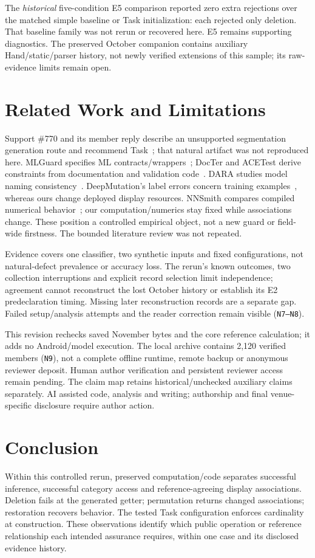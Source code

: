 \documentclass[10pt,conference]{IEEEtran}
\newcommand{\code}[1]{\texttt{#1}}
\begin{document}
The \emph{historical} five-condition E5 comparison reported zero extra rejections over the matched simple baseline or Task initialization: each rejected only deletion. That baseline family was not rerun or recovered here. E5 remains supporting diagnostics. The preserved October companion contains auxiliary Hand/static/parser history, not newly verified extensions of this sample; its raw-evidence limits remain open.

\section{Related Work and Limitations}
\label{sec:related}
Support \#770 and its member reply describe an unsupported segmentation generation route and recommend Task~\cite{support770,support770reply}; that natural artifact was not reproduced here. MLGuard specifies ML contracts/wrappers~\cite{mlguard}; DocTer and ACETest derive constraints from documentation and validation code~\cite{docter,acetest}. DARA studies model naming consistency~\cite{dara}. DeepMutation's label errors concern training examples~\cite{deepmutation}, whereas ours change deployed display resources. NNSmith compares compiled numerical behavior~\cite{nnsmith}; our computation/numerics stay fixed while associations change. These position a controlled empirical object, not a new guard or field-wide firstness. The bounded literature review was not repeated.

\label{sec:validity}
Evidence covers one classifier, two synthetic inputs and fixed configurations, not natural-defect prevalence or accuracy loss. The rerun's known outcomes, two collection interruptions and explicit record selection limit independence; agreement cannot reconstruct the lost October history or establish its E2 predeclaration timing. Missing later reconstruction records are a separate gap. Failed setup/analysis attempts and the reader correction remain visible (\code{N7--N8}).

This revision rechecks saved November bytes and the core reference calculation; it adds no Android/model execution. The local archive contains 2,120 verified members (\code{N9}), not a complete offline runtime, remote backup or anonymous reviewer deposit. Human author verification and persistent reviewer access remain pending. The claim map retains historical/unchecked auxiliary claims separately. AI assisted code, analysis and writing; authorship and final venue-specific disclosure require author action.

\section{Conclusion}
Within this controlled rerun, preserved computation/code separates successful inference, successful category access and reference-agreeing display associations. Deletion fails at the generated getter; permutation returns changed associations; restoration recovers behavior. The tested Task configuration enforces cardinality at construction. These observations identify which public operation or reference relationship each intended assurance requires, within one case and its disclosed evidence history.
\end{document}
